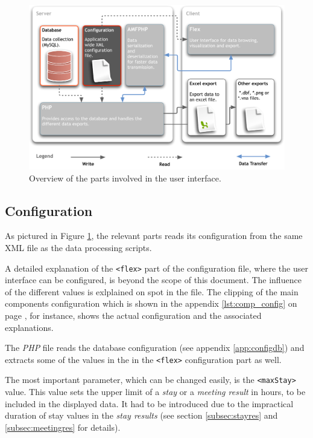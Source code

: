 \begin{figure}[htpb]
\begin{center}
  \includegraphics[width=\textwidth]{assets/pdf/application_design_miceminer.pdf}
  \caption[User Interface overview]{Overview of the parts involved in the user interface.}
  \label{fig:app_design_miceminer}
\end{center}
\end{figure}

\subsection{Configuration}
\label{subsec:miceminer_config}

As pictured in Figure \ref{fig:app_design_miceminer}, the relevant parts reads its configuration from the same XML file as the data processing scripts.

A detailed explanation of the \lstinline|<flex>| part of the configuration file, where the user interface can be configured, is beyond the scope of this document. The influence of the different values is exlplained on spot in the file. The clipping of the main components configuration which is shown in the appendix \ref{lst:comp_config} on page \pageref{lst:comp_config}, for instance, shows the actual configuration and the associated explanations.

The \textit{PHP} file reads the database configuration (see appendix \ref{app:configdb}) and extracts some of the values in the in the \lstinline|<flex>| configuration part as well.

The most important parameter, which can be changed easily, is the \lstinline|<maxStay>| value. This value sets the upper limit of a \textit{stay} or a \textit{meeting result} in hours, to be included in the displayed data. It had to be introduced due to the impractical duration of stay values in the \textit{stay results} (see section \ref{subsec:stayres} and \ref{subsec:meetingres} for details).   

